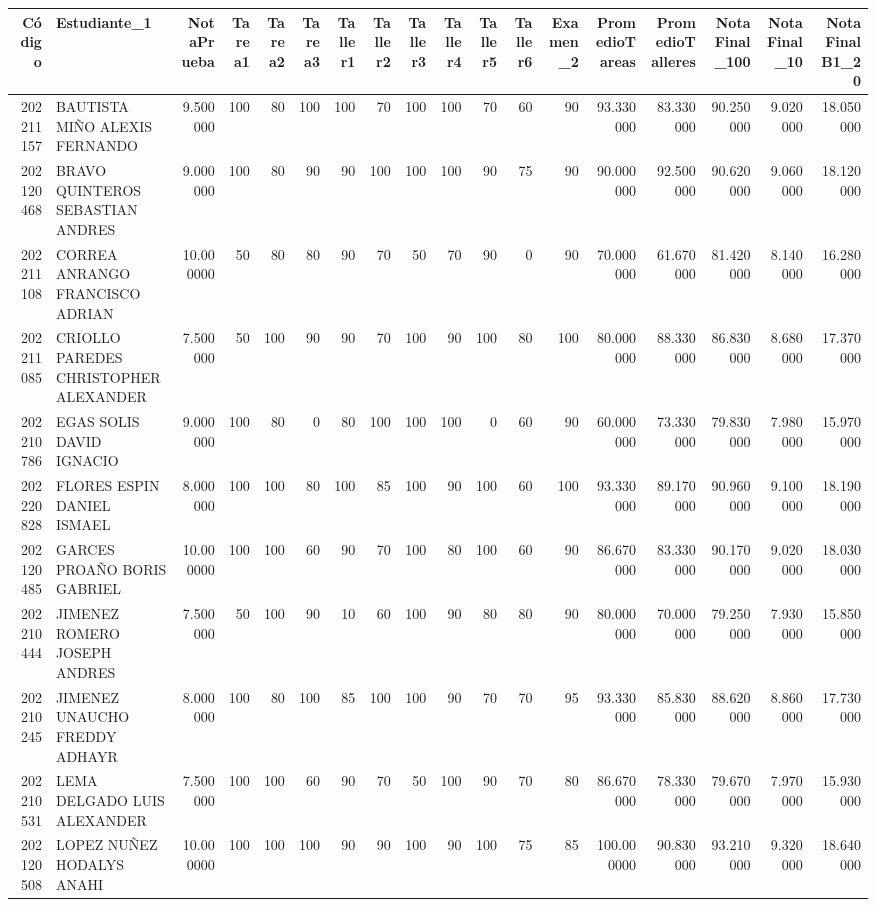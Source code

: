 \begin{tabular}{rlrrrrrrrrrrrrrrrr}
\toprule
Código & Estudiante_1 & NotaPrueba & Tarea1 & Tarea2 & Tarea3 & Taller1 & Taller2 & Taller3 & Taller4 & Taller5 & Taller6 & Examen_2 & PromedioTareas & PromedioTalleres & NotaFinal_100 & NotaFinal_10 & NotaFinalB1_20 \\
\midrule
202211157 & BAUTISTA MIÑO ALEXIS FERNANDO & 9.500000 & 100 & 80 & 100 & 100 & 70 & 100 & 100 & 70 & 60 & 90 & 93.330000 & 83.330000 & 90.250000 & 9.020000 & 18.050000 \\
202120468 & BRAVO QUINTEROS SEBASTIAN ANDRES & 9.000000 & 100 & 80 & 90 & 90 & 100 & 100 & 100 & 90 & 75 & 90 & 90.000000 & 92.500000 & 90.620000 & 9.060000 & 18.120000 \\
202211108 & CORREA ANRANGO FRANCISCO ADRIAN & 10.000000 & 50 & 80 & 80 & 90 & 70 & 50 & 70 & 90 & 0 & 90 & 70.000000 & 61.670000 & 81.420000 & 8.140000 & 16.280000 \\
202211085 & CRIOLLO PAREDES CHRISTOPHER ALEXANDER & 7.500000 & 50 & 100 & 90 & 90 & 70 & 100 & 90 & 100 & 80 & 100 & 80.000000 & 88.330000 & 86.830000 & 8.680000 & 17.370000 \\
202210786 & EGAS SOLIS DAVID IGNACIO & 9.000000 & 100 & 80 & 0 & 80 & 100 & 100 & 100 & 0 & 60 & 90 & 60.000000 & 73.330000 & 79.830000 & 7.980000 & 15.970000 \\
202220828 & FLORES ESPIN DANIEL ISMAEL & 8.000000 & 100 & 100 & 80 & 100 & 85 & 100 & 90 & 100 & 60 & 100 & 93.330000 & 89.170000 & 90.960000 & 9.100000 & 18.190000 \\
202120485 & GARCES PROAÑO BORIS GABRIEL & 10.000000 & 100 & 100 & 60 & 90 & 70 & 100 & 80 & 100 & 60 & 90 & 86.670000 & 83.330000 & 90.170000 & 9.020000 & 18.030000 \\
202210444 & JIMENEZ ROMERO JOSEPH ANDRES & 7.500000 & 50 & 100 & 90 & 10 & 60 & 100 & 90 & 80 & 80 & 90 & 80.000000 & 70.000000 & 79.250000 & 7.930000 & 15.850000 \\
202210245 & JIMENEZ UNAUCHO FREDDY ADHAYR & 8.000000 & 100 & 80 & 100 & 85 & 100 & 100 & 90 & 70 & 70 & 95 & 93.330000 & 85.830000 & 88.620000 & 8.860000 & 17.730000 \\
202210531 & LEMA DELGADO LUIS ALEXANDER & 7.500000 & 100 & 100 & 60 & 90 & 70 & 50 & 100 & 90 & 70 & 80 & 86.670000 & 78.330000 & 79.670000 & 7.970000 & 15.930000 \\
202120508 & LOPEZ NUÑEZ HODALYS ANAHI & 10.000000 & 100 & 100 & 100 & 90 & 90 & 100 & 90 & 100 & 75 & 85 & 100.000000 & 90.830000 & 93.210000 & 9.320000 & 18.640000 \\

\end{tabular}
